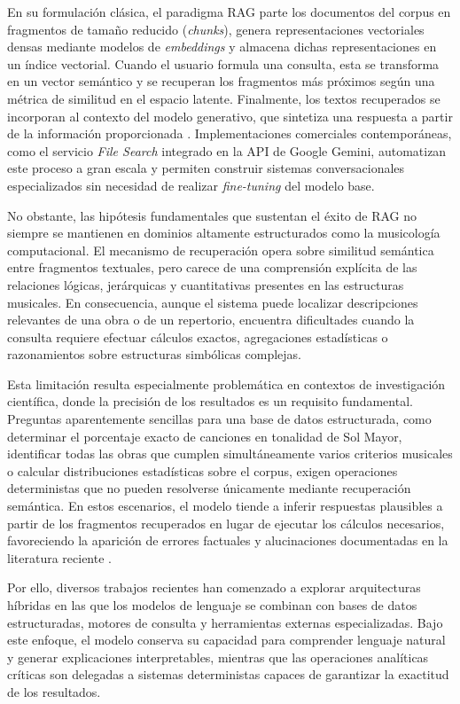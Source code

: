 En su formulación clásica, el paradigma RAG parte los documentos del corpus en fragmentos de tamaño reducido (\textit{chunks}), genera representaciones vectoriales densas mediante modelos de \textit{embeddings} y almacena dichas representaciones en un índice vectorial. Cuando el usuario formula una consulta, esta se transforma en un vector semántico y se recuperan los fragmentos más próximos según una métrica de similitud en el espacio latente. Finalmente, los textos recuperados se incorporan al contexto del modelo generativo, que sintetiza una respuesta a partir de la información proporcionada \citep{lewis2020retrieval}. Implementaciones comerciales contemporáneas, como el servicio \textit{File Search} integrado en la API de Google Gemini, automatizan este proceso a gran escala y permiten construir sistemas conversacionales especializados sin necesidad de realizar \textit{fine-tuning} del modelo base.

No obstante, las hipótesis fundamentales que sustentan el éxito de RAG no siempre se mantienen en dominios altamente estructurados como la musicología computacional. El mecanismo de recuperación opera sobre similitud semántica entre fragmentos textuales, pero carece de una comprensión explícita de las relaciones lógicas, jerárquicas y cuantitativas presentes en las estructuras musicales. En consecuencia, aunque el sistema puede localizar descripciones relevantes de una obra o de un repertorio, encuentra dificultades cuando la consulta requiere efectuar cálculos exactos, agregaciones estadísticas o razonamientos sobre estructuras simbólicas complejas.

Esta limitación resulta especialmente problemática en contextos de investigación científica, donde la precisión de los resultados es un requisito fundamental. Preguntas aparentemente sencillas para una base de datos estructurada, como determinar el porcentaje exacto de canciones en tonalidad de Sol Mayor, identificar todas las obras que cumplen simultáneamente varios criterios musicales o calcular distribuciones estadísticas sobre el corpus, exigen operaciones deterministas que no pueden resolverse únicamente mediante recuperación semántica. En estos escenarios, el modelo tiende a inferir respuestas plausibles a partir de los fragmentos recuperados en lugar de ejecutar los cálculos necesarios, favoreciendo la aparición de errores factuales y alucinaciones documentadas en la literatura reciente \citep{huang2023citation}.

Por ello, diversos trabajos recientes han comenzado a explorar arquitecturas híbridas en las que los modelos de lenguaje se combinan con bases de datos estructuradas, motores de consulta y herramientas externas especializadas. Bajo este enfoque, el modelo conserva su capacidad para comprender lenguaje natural y generar explicaciones interpretables, mientras que las operaciones analíticas críticas son delegadas a sistemas deterministas capaces de garantizar la exactitud de los resultados.


